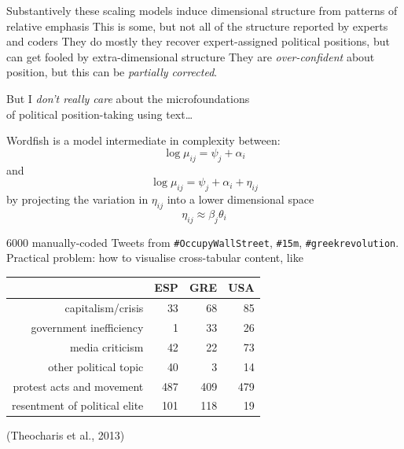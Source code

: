 \documentclass{mediumfoils}
\newcommand{\mkgrey}[1]{{\color{pale}#1}}
\begin{document}

Substantively these scaling models induce dimensional structure from patterns of relative emphasis
\ita
\itm This is some, but not all of the structure reported by experts and coders
\itz
They do mostly they recover expert-assigned political positions, but can get fooled by extra-dimensional structure
\pause
They are \textit{over-confident} about position, but this can be \textit{partially corrected}.



\begin{center}
But I \textit{don't really care} about the microfoundations\\of political position-taking using text\ldots
\end{center}
\vfill


Wordfish is a model intermediate in complexity between:
\[
\log \mu_{ij} = \psi_{j} + \alpha_{i}
\]
and
\[
\log \mu_{ij} = \psi_{j} + \alpha_{i} + \eta_{ij} 
\]
by projecting the variation in $\eta_{ij}$ into a lower dimensional space
\[
\eta_{ij} \approx \beta_{j}\theta_{i}   
\]





6000 manually-coded Tweets from \texttt{\#OccupyWallStreet}, \texttt{\#15m}, \texttt{\#greekrevolution}. 
\pause
Practical problem: how to visualise cross-tabular content, like
\begin{center}
{\footnotesize
\begin{tabular}{rrrr}
  \toprule
 & ESP & GRE & USA \\ 
  \midrule
  capitalism/crisis &  33 &  68 &  85 \\ 
  government inefficiency &   1 &  33 &  26 \\ 
  media criticism &  42 &  22 &  73 \\ 
  other political topic &  40 &   3 &  14 \\ 
  protest acts and movement & 487 & 409 & 479 \\ 
  resentment of political elite & 101 & 118 &  19 \\ 
  \bottomrule
\end{tabular}
}
\end{center}
\mkgrey{(Theocharis et al., 2013)}


\end{document}
